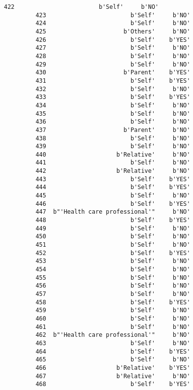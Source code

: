 \documentclass[11pt]{article}
\begin{document}
\begin{Verbatim}[commandchars=\\\{\}]
         422                        b'Self'     b'NO'  
         423                        b'Self'     b'NO'  
         424                        b'Self'     b'NO'  
         425                      b'Others'     b'NO'  
         426                        b'Self'    b'YES'  
         427                        b'Self'     b'NO'  
         428                        b'Self'     b'NO'  
         429                        b'Self'     b'NO'  
         430                      b'Parent'    b'YES'  
         431                        b'Self'    b'YES'  
         432                        b'Self'     b'NO'  
         433                        b'Self'    b'YES'  
         434                        b'Self'     b'NO'  
         435                        b'Self'     b'NO'  
         436                        b'Self'     b'NO'  
         437                      b'Parent'     b'NO'  
         438                        b'Self'     b'NO'  
         439                        b'Self'     b'NO'  
         440                    b'Relative'     b'NO'  
         441                        b'Self'     b'NO'  
         442                    b'Relative'     b'NO'  
         443                        b'Self'    b'YES'  
         444                        b'Self'    b'YES'  
         445                        b'Self'     b'NO'  
         446                        b'Self'    b'YES'  
         447  b"'Health care professional'"     b'NO'  
         448                        b'Self'    b'YES'  
         449                        b'Self'     b'NO'  
         450                        b'Self'     b'NO'  
         451                        b'Self'     b'NO'  
         452                        b'Self'    b'YES'  
         453                        b'Self'     b'NO'  
         454                        b'Self'     b'NO'  
         455                        b'Self'     b'NO'  
         456                        b'Self'     b'NO'  
         457                        b'Self'     b'NO'  
         458                        b'Self'    b'YES'  
         459                        b'Self'     b'NO'  
         460                        b'Self'     b'NO'  
         461                        b'Self'     b'NO'  
         462  b"'Health care professional'"     b'NO'  
         463                        b'Self'     b'NO'  
         464                        b'Self'    b'YES'  
         465                        b'Self'     b'NO'  
         466                    b'Relative'    b'YES'  
         467                    b'Relative'     b'NO'  
         468                        b'Self'    b'YES'  

\end{Verbatim}
\end{document}
